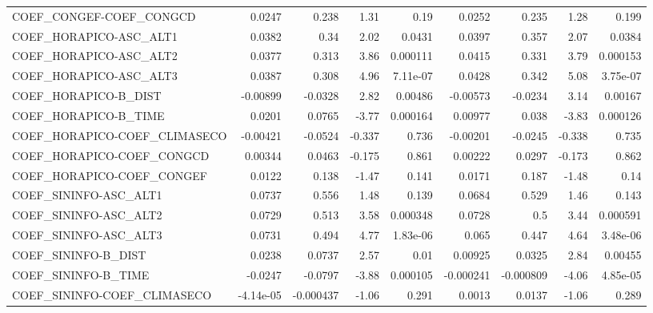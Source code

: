 \begin{tabular}{lrrrrrrrr}
COEF\_CONGEF-COEF\_CONGCD        &      0.0247 &        0.238 &    1.31 &     0.19 &     0.0252 &       0.235 &         1.28 &         0.199 \\
COEF\_HORAPICO-ASC\_ALT1         &      0.0382 &         0.34 &    2.02 &   0.0431 &     0.0397 &       0.357 &         2.07 &        0.0384 \\
COEF\_HORAPICO-ASC\_ALT2         &      0.0377 &        0.313 &    3.86 & 0.000111 &     0.0415 &       0.331 &         3.79 &      0.000153 \\
COEF\_HORAPICO-ASC\_ALT3         &      0.0387 &        0.308 &    4.96 & 7.11e-07 &     0.0428 &       0.342 &         5.08 &      3.75e-07 \\
COEF\_HORAPICO-B\_DIST           &    -0.00899 &      -0.0328 &    2.82 &  0.00486 &   -0.00573 &     -0.0234 &         3.14 &       0.00167 \\
COEF\_HORAPICO-B\_TIME           &      0.0201 &       0.0765 &   -3.77 & 0.000164 &    0.00977 &       0.038 &        -3.83 &      0.000126 \\
COEF\_HORAPICO-COEF\_CLIMASECO   &    -0.00421 &      -0.0524 &  -0.337 &    0.736 &   -0.00201 &     -0.0245 &       -0.338 &         0.735 \\
COEF\_HORAPICO-COEF\_CONGCD      &     0.00344 &       0.0463 &  -0.175 &    0.861 &    0.00222 &      0.0297 &       -0.173 &         0.862 \\
COEF\_HORAPICO-COEF\_CONGEF      &      0.0122 &        0.138 &   -1.47 &    0.141 &     0.0171 &       0.187 &        -1.48 &          0.14 \\
COEF\_SININFO-ASC\_ALT1          &      0.0737 &        0.556 &    1.48 &    0.139 &     0.0684 &       0.529 &         1.46 &         0.143 \\
COEF\_SININFO-ASC\_ALT2          &      0.0729 &        0.513 &    3.58 & 0.000348 &     0.0728 &         0.5 &         3.44 &      0.000591 \\
COEF\_SININFO-ASC\_ALT3          &      0.0731 &        0.494 &    4.77 & 1.83e-06 &      0.065 &       0.447 &         4.64 &      3.48e-06 \\
COEF\_SININFO-B\_DIST            &      0.0238 &       0.0737 &    2.57 &     0.01 &    0.00925 &      0.0325 &         2.84 &       0.00455 \\
COEF\_SININFO-B\_TIME            &     -0.0247 &      -0.0797 &   -3.88 & 0.000105 &  -0.000241 &   -0.000809 &        -4.06 &      4.85e-05 \\
COEF\_SININFO-COEF\_CLIMASECO    &   -4.14e-05 &    -0.000437 &   -1.06 &    0.291 &     0.0013 &      0.0137 &        -1.06 &         0.289 \\

\end{tabular}
